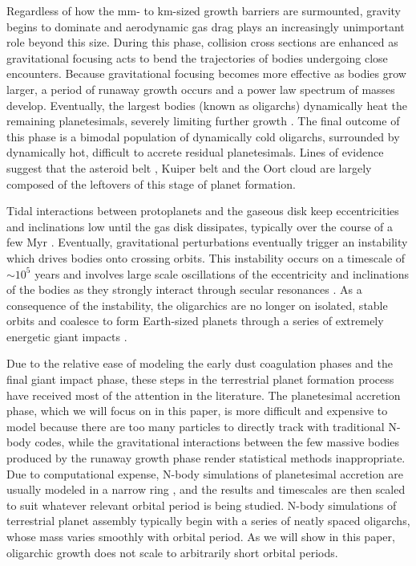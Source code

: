 Regardless of how the mm- to km-sized growth barriers are surmounted, gravity begins to dominate and aerodynamic gas drag 
plays an increasingly unimportant role beyond this size. During this phase, collision cross sections are enhanced as gravitational 
focusing \cite{safronov69} acts to bend the trajectories of bodies undergoing close encounters. Because gravitational focusing 
becomes more effective as bodies grow larger, a period of runaway growth occurs \cite{wetherill89, kokubo96, barnes09} and a 
power law spectrum of masses develop. Eventually, the largest bodies (known as oligarchs) dynamically heat the remaining 
planetesimals, severely limiting further growth \cite{kokubo98}. The final outcome of this phase is a bimodal population of 
dynamically cold oligarchs, surrounded by dynamically hot, difficult to accrete residual planetesimals. Lines of evidence suggest 
that the asteroid belt \cite{bottke05, morbidelli09}, Kuiper belt \cite{duncan89, levison08, sheppard10} and the Oort cloud  \cite{levison11} are largely composed of the leftovers of this stage of planet formation.

Tidal interactions between protoplanets and the gaseous disk keep eccentricities and inclinations low until the gas disk dissipates, typically over the course of a few Myr \cite{mamajek09}. Eventually, gravitational perturbations eventually trigger an instability which drives bodies onto crossing orbits. This instability occurs on a timescale of $\sim 10^{5}$ years and involves large scale oscillations of the eccentricity and inclinations of the bodies as they strongly interact through secular resonances \cite{chambers98}.
As a consequence of the instability, the oligarchics are no longer
on isolated, stable orbits and coalesce to form Earth-sized planets
through a series of extremely energetic giant 
impacts \cite{kokubo02, raymond05, raymond06}. 

Due to the relative ease of modeling the early dust coagulation phases
and the final giant impact phase, these steps in the terrestrial
planet formation process have received most of the attention in the
literature. The planetesimal accretion phase, which we will focus on
in this paper, is more difficult and expensive to model because there are too
many particles to directly track with traditional N-body codes, while
the gravitational interactions between the few massive bodies produced by the runaway growth phase \cite{ida93, kokubo95, kokubo98} render statistical methods inappropriate. Due to computational expense, N-body simulations of
planetesimal accretion are usually modeled in a narrow
ring \cite{kokubo96, kokubo98}, and the results and timescales are then scaled to suit whatever relevant orbital period is being 
studied. N-body simulations of terrestrial planet assembly typically begin with a series of neatly spaced oligarchs, whose mass 
varies smoothly with orbital period. As we will show in this paper, oligarchic growth does not scale to arbitrarily short
orbital periods.

